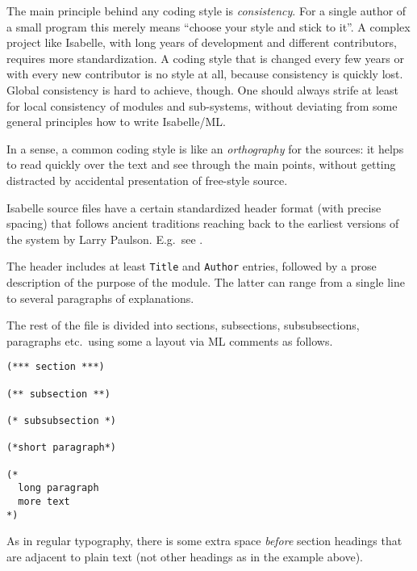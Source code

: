 \begin{isabellebody}
\begin{isamarkuptext}
  The main principle behind any coding style is \emph{consistency}.
  For a single author of a small program this merely means ``choose
  your style and stick to it''.  A complex project like Isabelle, with
  long years of development and different contributors, requires more
  standardization.  A coding style that is changed every few years or
  with every new contributor is no style at all, because consistency
  is quickly lost.  Global consistency is hard to achieve, though.
  One should always strife at least for local consistency of modules
  and sub-systems, without deviating from some general principles how
  to write Isabelle/ML.

  In a sense, a common coding style is like an \emph{orthography} for
  the sources: it helps to read quickly over the text and see through
  the main points, without getting distracted by accidental
  presentation of free-style source.%
\end{isamarkuptext}%
\isamarkuptrue%
%
\isamarkuptrue%
%
\begin{isamarkuptext}%
Isabelle source files have a certain standardized header
  format (with precise spacing) that follows ancient traditions
  reaching back to the earliest versions of the system by Larry
  Paulson.  E.g.\ see \hyperlink{file.~~/src/Pure/thm.ML}{\mbox{}}.

  The header includes at least \verb|Title| and \verb|Author| entries, followed by a prose description of the purpose of
  the module.  The latter can range from a single line to several
  paragraphs of explanations.

  The rest of the file is divided into sections, subsections,
  subsubsections, paragraphs etc.\ using some a layout via ML comments
  as follows.

\begin{verbatim}
(*** section ***)

(** subsection **)

(* subsubsection *)

(*short paragraph*)

(*
  long paragraph
  more text
*)
\end{verbatim}

  As in regular typography, there is some extra space \emph{before}
  section headings that are adjacent to plain text (not other headings
  as in the example above).


\end{isamarkuptext}
\end{isabellebody}
